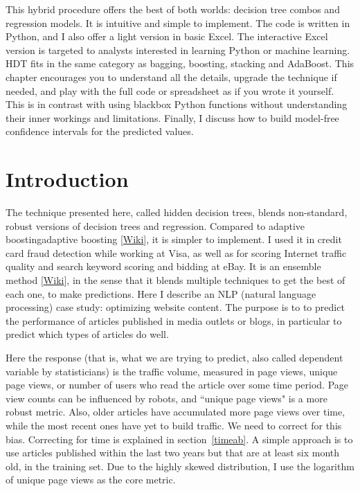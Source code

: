 \documentclass[oneside,10pt]{book}
\begin{document}
This hybrid procedure offers the best of both worlds: decision tree combos  and \textcolor{index}{regression} models.  It is intuitive and simple to implement. The code is written in Python, and I also offer a light version in basic Excel. The interactive Excel version is targeted to analysts interested in learning Python or machine learning. HDT fits in the same category as bagging, \textcolor{index}{boosting}, stacking and \textcolor{index}{AdaBoost}.  This chapter encourages you to understand all the details, upgrade the technique if needed, and play with the full code or spreadsheet as if you wrote it yourself. This is in contrast with using blackbox Python functions without understanding their inner workings and limitations. Finally, I discuss how to build model-free confidence intervals for the predicted values.

 \section{Introduction}

The technique presented here, called \textcolor{index}{hidden decision trees}, blends non-standard, robust versions of
 \textcolor{index}{decision trees} and regression. Compared to \textcolor{index}{adaptive boosting}\textcolor{index}{adaptive boosting} [\href{https://en.wikipedia.org/wiki/AdaBoost}{Wiki}], it is simpler to implement. I used it in credit card fraud detection while working at Visa, as well as for scoring Internet traffic quality and search keyword scoring and bidding at eBay. It is an \textcolor{index}{ensemble method} [\href{https://en.wikipedia.org/wiki/Ensemble_learning}{Wiki}], in the sense that it
blends multiple techniques to get the best of each one, to make predictions.  Here I describe an NLP (\textcolor{index}{natural language processing}) case study: optimizing website content.
The purpose is to to predict the performance of articles published in media outlets or blogs, in particular to predict which types of articles do well.


Here the response (that is, what we are trying to predict, also called dependent variable by statisticians) is the traffic volume, measured in page views, unique page views, or number of users who read the article over some time period. Page view counts
can be influenced by robots, and ``unique page views" is a more robust metric. Also, older articles have accumulated more page views over time, while the most recent ones
 have yet to build traffic. We need to correct for this bias.
Correcting for time is explained in section~\ref{timeab}. A simple approach is to use articles published within the last two years but that are at least six month old, in the \textcolor{index}{training set}. Due to
 the highly skewed distribution, I use the logarithm of unique page views as the core metric.
\end{document}
